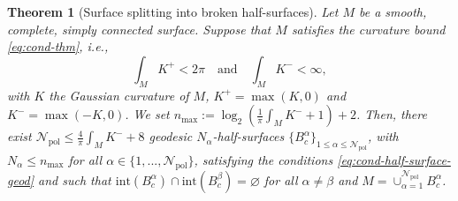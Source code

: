 \documentclass{article}
\newcommand{\surf}{M}
\newcommand{\halfP}{B}
\newcommand{\Npol}{\mathcal{N}_{\mathrm{pol}}}
\newtheorem{theorem}{Theorem}
\theoremstyle{remark}
\theoremstyle{prpart}
\begin{document}
\begin{theorem}[Surface splitting into broken half-surfaces]\label{thm:splitting-surf}
  Let $\surf$ be a smooth, complete, simply connected surface. Suppose that $\surf$ satisfies the curvature bound \eqref{eq:cond-thm}, i.e.,
\begin{equation*}%
  \int_{\surf}K^+<2\pi\quad\text{and}\quad\int_{\surf}K^-<\infty,
\end{equation*} 
with $K$ the Gaussian curvature of $\surf$, $K^+=\max(K,0)$ and $K^-=\max(-K,0)$. We set $n_{\max}:=\log_2\left(\frac{1}{\pi}\int_\surf K^-+1\right)+2$. Then, there exist $\Npol\leq \frac{4}{\pi}\int_\surf K^-+8$ geodesic $N_{\alpha}$-half-surfaces $\{\halfP_c^\alpha\}_{1\leq\alpha\leq\Npol}$, with $N_\alpha\leq n_{\max}$ for all $\alpha\in\{1,...,\Npol\}$, satisfying the conditions \eqref{eq:cond-half-surface-geod} and such that $\mathrm{int}(\halfP_c^\alpha)\cap \mathrm{int}(\halfP_c^\beta)=\varnothing$ for all $\alpha\neq\beta$ and $\surf = \cup_{\alpha=1}^{\Npol} \halfP_c^{\alpha}$.
\end{theorem}
\end{document}
